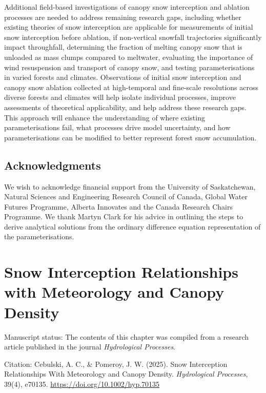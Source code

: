 \documentclass[
  letterpaper,
]{tex/uofsthesis-cs}
\begin{document}
Additional field-based investigations of canopy snow interception and
ablation processes are needed to address remaining research gaps,
including whether existing theories of snow interception are applicable
for measurements of initial snow interception before ablation, if
non-vertical snowfall trajectories significantly impact throughfall,
determining the fraction of melting canopy snow that is unloaded as mass
clumps compared to meltwater, evaluating the importance of wind
resuspension and transport of canopy snow, and testing parameterisations
in varied forests and climates. Observations of initial snow
interception and canopy snow ablation collected at high-temporal and
fine-scale resolutions across diverse forests and climates will help
isolate individual processes, improve assessments of theoretical
applicability, and help address these research gaps. This approach will
enhance the understanding of where existing parameterisations fail, what
processes drive model uncertainty, and how parameterisations can be
modified to better represent forest snow accumulation.

\section{Acknowledgments}\label{acknowledgments}

We wish to acknowledge financial support from the University of
Saskatchewan, Natural Sciences and Engineering Research Council of
Canada, Global Water Futures Programme, Alberta Innovates and the Canada
Research Chairs Programme. We thank Martyn Clark for his advice in
outlining the steps to derive analytical solutions from the ordinary
difference equation representation of the parameterisations.


\chapter{Snow Interception Relationships with Meteorology and Canopy
Density}\label{sec-chapter-3}

Manuscript status: The contents of this chapter was compiled from a
research article published in the journal \emph{Hydrological Processes}.

Citation: Cebulski, A. C., \& Pomeroy, J. W. (2025). Snow Interception
Relationships With Meteorology and Canopy Density. \emph{Hydrological
Processes}, 39(4), e70135. \url{https://doi.org/10.1002/hyp.70135}
\end{document}
